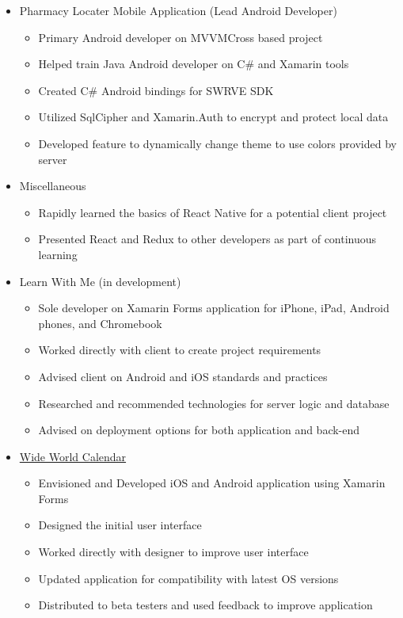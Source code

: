 \documentclass[12pt,letterpaper,sans]{moderncv}
\begin{document}
\begin{itemize}[leftmargin=1.24in]
\begin{itemize}
			\end{itemize} 
    	\item Pharmacy Locater Mobile Application (Lead Android Developer)
	    	\begin{itemize}
		    	\item Primary Android developer on MVVMCross based project
		    	\item Helped train Java Android developer on C\# and Xamarin tools
		    	\item Created C\# Android bindings for SWRVE SDK
		    	\item Utilized SqlCipher and Xamarin.Auth to encrypt and protect local data
		    	\item Developed feature to dynamically change theme to use colors provided by server
		    \end{itemize} 
	   	\item Miscellaneous
	   		\begin{itemize}
	   			\item Rapidly learned the basics of React Native for a potential client project
	   			\item Presented React and Redux to other developers as part of continuous learning
	   		\end{itemize}
    \end{itemize} 
	\begin{itemize}[leftmargin=1.24in]
		\item Learn With Me (in development)
			\begin{itemize}
				\item Sole developer on Xamarin Forms application for iPhone, iPad, Android phones, and Chromebook
				\item Worked directly with client to create project requirements
				\item Advised client on Android and iOS standards and practices
				\item Researched and recommended technologies for server logic and database
				\item Advised on deployment options for both application and back-end
			\end{itemize}
		\item \href{https://github.com/HofmaDresu/WideWorldCalendar}{Wide World Calendar}
			\begin{itemize}
				\item Envisioned and Developed iOS and Android application using Xamarin Forms
				\item Designed the initial user interface
				\item Worked directly with designer to improve user interface
				\item Updated application for compatibility with latest OS versions
				\item Distributed to beta testers and used feedback to improve application
			\end{itemize} 
	\end{itemize}
\end{document}
